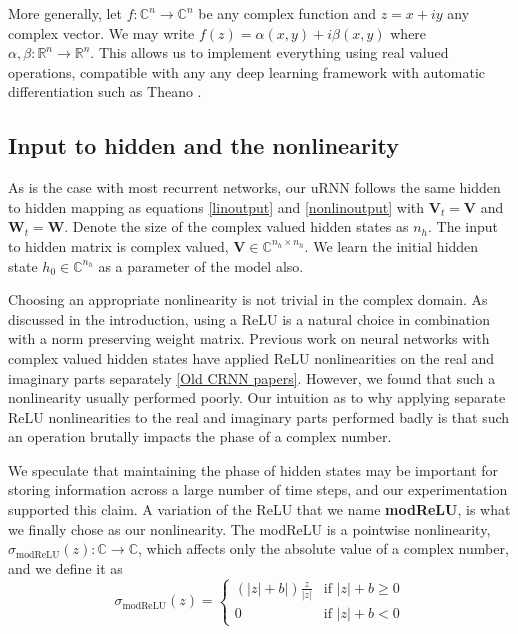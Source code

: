 \documentclass{article} %
\newcommand{\matr}[1]{\mathbf{#1}}
\newcommand\RR{\mathbb{R}}
\newcommand\CC{\mathbb{C}}
\begin{document}
More generally, let $f: \CC^n \rightarrow \CC^n$ be any complex function and $z = x + i y$ 
any complex vector. We may write $ f(z) = \alpha(x, y) + i \beta(x, y) $ where 
$\alpha, \beta : \RR^n \rightarrow \RR^n$. 
This allows us to implement everything using real valued operations, compatible with any
any deep learning framework with automatic differentiation such as Theano \citep{Fred2010}.

\subsection{Input to hidden and the nonlinearity}

As is the case with most recurrent networks, our uRNN follows the same hidden to hidden mapping as 
equations \ref{linoutput} and \ref{nonlinoutput} with $\matr{V}_t = \matr{V}$ and $\matr{W}_t = \matr{W}$. 
Denote the size of the complex valued hidden states as $n_h$.
The input to hidden matrix is complex valued, $\matr{V} \in \CC^{n_h \times n_h}$. 
We learn the initial hidden state $h_0 \in \CC^{n_h}$ as a parameter of the model also.

Choosing an appropriate nonlinearity is not trivial in the complex domain.
As discussed in the introduction, using a ReLU is a natural choice in combination with a norm preserving
weight matrix. {\color{red}Previous work on neural networks with complex valued} hidden states 
have applied ReLU nonlinearities on the real and imaginary parts separately \ref{Old CRNN papers}.
However, we found that such a nonlinearity usually performed poorly.
Our intuition as to why applying separate ReLU nonlinearities to the real 
and imaginary parts performed badly is that such an operation brutally impacts the 
phase of a complex number.

We speculate that maintaining the phase of hidden states may be important for storing information 
across a large number of time steps, and our experimentation supported this claim.
A variation of the ReLU that we name {\bf modReLU}, is what we 
finally chose as our nonlinearity. The modReLU is a pointwise nonlinearity,  
$\sigma_\mathrm{modReLU} (z) : \CC \rightarrow \CC$, which
affects only the absolute value of a complex number, and we define it as 
\begin{equation} \sigma_\mathrm{modReLU} (z) = 
\left\{
  \begin{array}{ll}
    (|z|+b|) \frac{z}{|z|}  & \mbox{if } |z| + b \geq 0 \\
    0 & \mbox{if } |z| + b < 0
  \end{array}
\right.
\end{equation}
\end{document}

